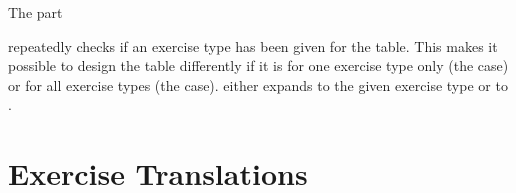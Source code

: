 \documentclass{xsim-manual}
\begin{document}
\begin{sourcecode}
\end{sourcecode}

The part
\begin{sourcecode}
\end{sourcecode}
repeatedly checks if an exercise type has been given for the table.  This
makes it possible to design the table differently if it is for one exercise
type only (the  case) or for all exercise types (the 
case).   either expands to the given
exercise type or to .

\section{Exercise Translations}\label{sec:exerc-transl}
\end{document}
